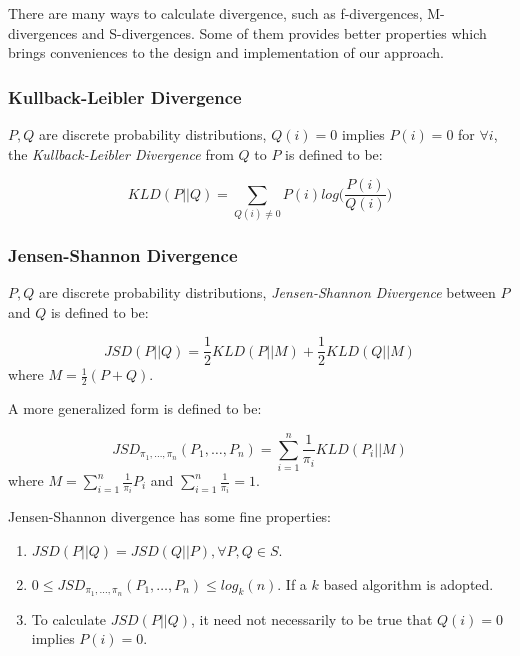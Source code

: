 \documentclass[a4paper]{IEEEtran}
\begin{document}
			There are many ways to calculate divergence, such as f-divergences, M-divergences and S-divergences. Some of them provides better properties which brings conveniences to the design and implementation of our approach.
			
			\subsubsection{Kullback-Leibler Divergence}
			$P,Q$ are discrete probability distributions, $Q(i)=0$ implies $P(i)=0$ for $\forall i$, the \textit{Kullback-Leibler Divergence} from $Q$ to $P$ is defined to be:
			
			\begin{equation}
			KLD(P||Q) = \sum_{Q(i)\ne 0} P(i)log\Big(\frac{P(i)}{Q(i)}\Big)
			\end{equation}
			
			\subsubsection{Jensen-Shannon Divergence}
			$P,Q$ are discrete probability distributions, \textit{Jensen-Shannon Divergence} between $P$ and $Q$ is defined to be:
			
			\begin{equation}
			JSD(P||Q) = \frac{1}{2}KLD(P||M) + \frac{1}{2}KLD(Q||M)
			\end{equation}
			where $\displaystyle M = \frac{1}{2}(P+Q)$.
			
			A more generalized form is defined to be:
			
			\begin{equation}
			JSD_{\pi_1, \dots, \pi_n}(P_1, \dots, P_n) = \sum_{i=1}^{n}\frac{1}{\pi_i}KLD(P_i||M)
			\end{equation}
			where $\displaystyle M = \sum_{i=1}^{n}\frac{1}{\pi_i}P_i$ and $\displaystyle \sum_{i=1}^{n}\frac{1}{\pi_i} = 1$.
			
			Jensen-Shannon divergence has some fine properties:
			\begin{enumerate}
				\item $JSD(P||Q) = JSD(Q||P), \forall P, Q\in S$.
				\item $0 \le JSD_{\pi_1, \dots, \pi_n}(P_1, \dots, P_n) \le log_k(n)$. If a $k$ based algorithm is adopted.
				\item To calculate $JSD(P||Q)$, it need not necessarily to be true that $Q(i)=0$ implies $P(i)=0$.
			\end{enumerate}
		
\end{document}
